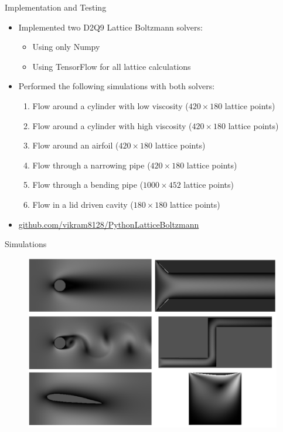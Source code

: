 \documentclass{beamer}
\begin{document}
\begin{frame}{Implementation and Testing}

\begin{itemize}
    \item Implemented two D2Q9 Lattice Boltzmann solvers: 
    \begin{itemize}
        \item Using only Numpy
        \item Using TensorFlow for all lattice calculations
    \end{itemize}
    \vspace{10pt}
    \item Performed the following simulations with both solvers:
    \begin{enumerate}
        \item Flow around a cylinder with low viscosity ($420\times180$ lattice points)
        \item Flow around a cylinder with high viscosity ($420\times180$ lattice points)
        \item Flow around an airfoil ($420\times180$ lattice points)
        \item Flow through a narrowing pipe ($420\times180$ lattice points)
        \item Flow through a bending pipe ($1000\times452$ lattice points)
        \item Flow in a lid driven cavity ($180\times180$ lattice points)
    \end{enumerate}
    \vspace{30pt}
    \item \small\url{github.com/vikram8128/PythonLatticeBoltzmann}
\end{itemize}

\end{frame}


\begin{frame}{Simulations}


\begin{figure}[H] 
	\centering
	\label{videoCuts}
	\includegraphics[width=4.5in]{Diagrams/SimulationSamples.png}
\end{figure}

\end{frame}
\end{document}
